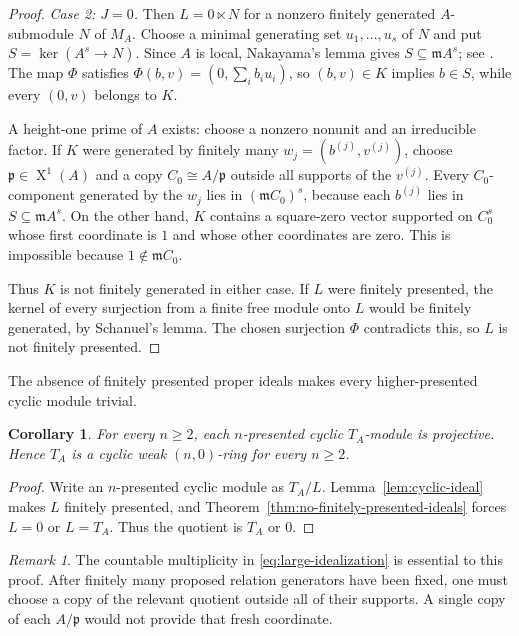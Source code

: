 \documentclass[11pt]{amsart}
\numberwithin{equation}{section}
\newtheorem{corollary}[theorem]{Corollary}
\theoremstyle{definition}
\theoremstyle{remark}
\newtheorem{remark}[theorem]{Remark}
\newcommand{\SpecOne}{\operatorname{X}^{1}}
\begin{document}
\begin{proof}
\smallskip
\noindent\emph{Case 2: $J=0$.}
Then $L=0\ltimes N$ for a nonzero finitely generated $A$-submodule $N$ of $M_A$.  Choose a minimal generating set $u_1,\ldots,u_s$ of $N$ and put $S=\ker(A^s\to N)$.  Since $A$ is local, Nakayama's lemma gives $S\subseteq\mathfrak mA^s$; see \cite[Chapter~2]{AtiyahMacdonald}.  The map $\Phi$ satisfies $\Phi(b,v)=(0,\sum_i b_i u_i)$, so $(b,v)\in K$ implies $b\in S$, while every $(0,v)$ belongs to $K$.

A height-one prime of $A$ exists: choose a nonzero nonunit and an irreducible factor.  If $K$ were generated by finitely many $w_j=(b^{(j)},v^{(j)})$, choose $\mathfrak p\in\SpecOne(A)$ and a copy $C_0\cong A/\mathfrak p$ outside all supports of the $v^{(j)}$.  Every $C_0$-component generated by the $w_j$ lies in $(\mathfrak mC_0)^s$, because each $b^{(j)}$ lies in $S\subseteq\mathfrak mA^s$.  On the other hand, $K$ contains a square-zero vector supported on $C_0^s$ whose first coordinate is $1$ and whose other coordinates are zero.  This is impossible because $1\notin\mathfrak mC_0$.

Thus $K$ is not finitely generated in either case.  If $L$ were finitely presented, the kernel of every surjection from a finite free module onto $L$ would be finitely generated, by Schanuel's lemma.  The chosen surjection $\Phi$ contradicts this, so $L$ is not finitely presented.
\end{proof}

The absence of finitely presented proper ideals makes every higher-presented cyclic module trivial.

\begin{corollary}\label{cor:higher-cyclic-projective}
For every $n\geq2$, each $n$-presented cyclic $T_A$-module is projective.  Hence $T_A$ is a cyclic weak $(n,0)$-ring for every $n\geq2$.
\end{corollary}

\begin{proof}
Write an $n$-presented cyclic module as $T_A/L$.  Lemma~\ref{lem:cyclic-ideal} makes $L$ finitely presented, and Theorem~\ref{thm:no-finitely-presented-ideals} forces $L=0$ or $L=T_A$.  Thus the quotient is $T_A$ or $0$.
\end{proof}

\begin{remark}\label{rem:fresh-coordinate}
The countable multiplicity in \eqref{eq:large-idealization} is essential to this proof.  After finitely many proposed relation generators have been fixed, one must choose a copy of the relevant quotient outside all of their supports.  A single copy of each $A/\mathfrak p$ would not provide that fresh coordinate.
\end{remark}
\end{document}
